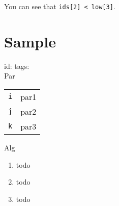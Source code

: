 \documentclass{article}
\begin{document}
You can see that \texttt{ids[2] < low[3]}.

\clearpage %
\section*{Sample}
id: \quad tags: \\
Par
\begin{tabular}{ll}
    \texttt{i}  & par1 \\
    \texttt{j}  & par2 \\
    \texttt{k}  & par3 \\
\end{tabular}

Alg
\begin{enumerate}
\item
    todo
\item
    todo
\item
    todo

\end{enumerate}
\
\section*{}



\begin{comment}
\begin{equation*}
\begin{split}
    \mathcal{L}(H(S), \lambda) 
    &= \sum_{i=1}^9 p_i \log_3{\frac{1}{p_i}} + \lambda \left(\sum_{i=1}^9 p_i - 1 \right) \\
    \pdv{\mathcal{L}}{p_i}
    &= -\log_3{p_i} - \frac{1}{\ln{3}} + \lambda = 0 \quad i \in \{1,2,\dots,9\} \\
    \pdv{\mathcal{L}}{\lambda}
    &= \sum_{i=1}^9 p_i - 1 = 0 \\
    \therefore p_i &= \frac{1}{9}
\end{split}
\end{equation*}
\end{comment}
\end{document}
